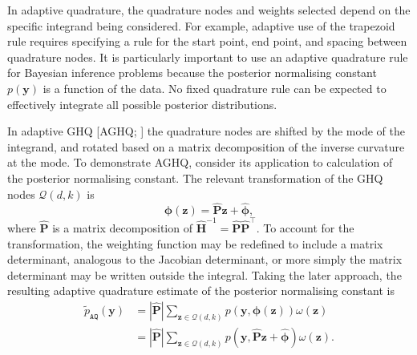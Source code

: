 \documentclass[a4paper, nobind]{templates/ociamthesis}
\begin{document}
In adaptive quadrature, the quadrature nodes and weights selected depend on the specific integrand being considered.
For example, adaptive use of the trapezoid rule requires specifying a rule for the start point, end point, and spacing between quadrature nodes.
It is particularly important to use an adaptive quadrature rule for Bayesian inference problems because the posterior normalising constant \(p(\mathbf{y})\) is a function of the data.
No fixed quadrature rule can be expected to effectively integrate all possible posterior distributions.

In adaptive GHQ {[}AGHQ; \textcite{naylor1982applications}{]} the quadrature nodes are shifted by the mode of the integrand, and rotated based on a matrix decomposition of the inverse curvature at the mode.
To demonstrate AGHQ, consider its application to calculation of the posterior normalising constant.
The relevant transformation of the GHQ nodes \(\mathcal{Q}(d, k)\) is
\begin{equation}
\boldsymbol{\mathbf{\phi}}(\mathbf{z}) = \hat{\mathbf{P}} \mathbf{z} + \hat{\boldsymbol{\mathbf{\phi}}},
\end{equation}
where \(\hat{\mathbf{P}}\) is a matrix decomposition of \(\hat{\boldsymbol{\mathbf{H}}}^{-1} = \hat{\mathbf{P}} \hat{\mathbf{P}}^\top\).
To account for the transformation, the weighting function may be redefined to include a matrix determinant, analogous to the Jacobian determinant, or more simply the matrix determinant may be written outside the integral.
Taking the later approach, the resulting adaptive quadrature estimate of the posterior normalising constant is
\begin{align}
\tilde p_{\texttt{AQ}}(\mathbf{y})
&= | \hat{\mathbf{P}} | \sum_{\mathbf{z} \in \mathcal{Q}(d, k)} p(\mathbf{y}, \boldsymbol{\mathbf{\phi}}(\mathbf{z})) \omega(\mathbf{z}) \\
&=  | \hat{\mathbf{P}} | \sum_{\mathbf{z} \in \mathcal{Q}(d, k)} p(\mathbf{y}, \hat{\mathbf{P}} \mathbf{z} + \hat{\boldsymbol{\mathbf{\phi}}}) \omega(\mathbf{z}).
\end{align}
\end{document}
